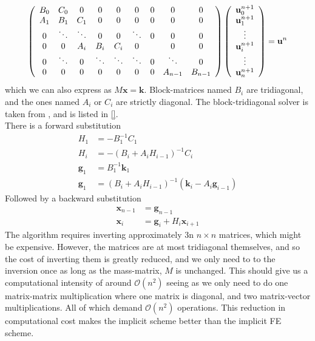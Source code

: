 \begin{align}\label{block_tridiagonal_matrix}
   \left(\begin{array}{c c c c c c c c c}
        B_0 & C_0 &0 &0 &0 &0 &0 &0 &0\\
        A_1 & B_1 & C_1 &0 &0 &0 &0 &0 &0\\
        0&\ddots & \ddots & 0 & 0 & \ddots &0&0&0\\
        0 & 0&A_i & B_i & C_i& 0 &  &0&0\\
        0& \ddots&0&\ddots & \ddots & \ddots & 0 & \ddots &0\\
         0&0 &0 &0&0 &0&0&A_{n-1} & B_{n-1}
       \end{array}\right) \left(\begin{array}{c}
             \mathbf{u}^{n+1}_{0}\\
             \mathbf{u}^{n+1}_{1}\\
             \vdots\\
             \mathbf{u}^{n+1}_{i}\\
             \vdots\\
             \mathbf{u}^{n+1}_{n}
             \end{array}\right) = \mathbf{u}^{n}
\end{align}
which we can also express as $M\mathbf{x} = \mathbf{k}$. Block-matrices named $B_i$ are tridiagonal, and the ones named $A_i$ or $C_i$ are strictly diagonal. 
The block-tridiagonal solver is taken from \cite{}, and is listed in \ref{}.\\
There is a forward substitution
\begin{align*}
 H_1 &= -B_1^{-1}C_1\nonumber \\
 H_i &= -\left(B_i+A_iH_{i-1}\right)^{-1}C_i \nonumber \\
 \mathbf{g}_1 &= B_1^{-1}\mathbf{k}_1 \nonumber\\
 \mathbf{g}_1 &= \left(B_i+A_iH_{i-1}\right)^{-1}\left(\mathbf{k}_i-A_i\mathbf{g}_{i-1}\right)\nonumber
 \end{align*}
 Followed by a backward substitution
 \begin{align*}
  \mathbf{x}_{n-1} &= \mathbf{g}_{n-1}\nonumber\\
  \mathbf{x}_i &= \mathbf{g}_i + H_i\mathbf{x}_{i+1} \nonumber
 \end{align*}
The algorithm requires inverting approximately 3n $n\times n$ matrices, which might be expensive. However, the matrices are at most tridiagonal themselves, and so the cost of inverting them is greatly reduced, and we only need to to the inversion once as long as the mass-matrix, $M$ is unchanged. This should give us a computational intensity of around $\mathcal{O}(n^2)$ seeing as we only need to do one matrix-matrix multiplication where one matrix is diagonal, and two matrix-vector multiplications. All of which demand $\mathcal{O}(n^2)$ operations. This reduction in computational cost makes the implicit scheme better than the implicit FE scheme.

